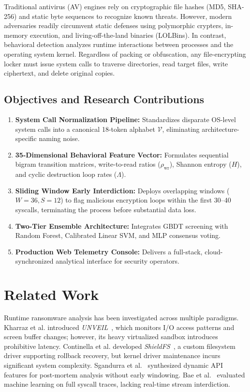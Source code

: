 \documentclass[conference]{IEEEtran}
\begin{document}
Traditional antivirus (AV) engines rely on cryptographic file hashes (MD5, SHA-256) and static byte sequences to recognize known threats. However, modern adversaries readily circumvent static defenses using polymorphic crypters, in-memory execution, and living-off-the-land binaries (LOLBins). In contrast, behavioral detection analyzes runtime interactions between processes and the operating system kernel. Regardless of packing or obfuscation, any file-encrypting locker must issue system calls to traverse directories, read target files, write ciphertext, and delete original copies.

\subsection{Objectives and Research Contributions}
\begin{enumerate}
    \item \textbf{System Call Normalization Pipeline:} Standardizes disparate OS-level system calls into a canonical 18-token alphabet $\mathcal{V}$, eliminating architecture-specific naming noise.
    \item \textbf{35-Dimensional Behavioral Feature Vector:} Formulates sequential bigram transition matrices, write-to-read ratios ($\rho_{\text{wr}}$), Shannon entropy ($H$), and cyclic destruction loop rates ($\Lambda$).
    \item \textbf{Sliding Window Early Interdiction:} Deploys overlapping windows ($W=36, S=12$) to flag malicious encryption loops within the first 30--40 syscalls, terminating the process before substantial data loss.
    \item \textbf{Two-Tier Ensemble Architecture:} Integrates GBDT screening with Random Forest, Calibrated Linear SVM, and MLP consensus voting.
    \item \textbf{Production Web Telemetry Console:} Delivers a full-stack, cloud-synchronized analytical interface for security operators.
\end{enumerate}

\section{Related Work}
Runtime ransomware analysis has been investigated across multiple paradigms. Kharraz et al. introduced \textit{UNVEIL}~\cite{kharraz2016unveil}, which monitors I/O access patterns and screen buffer changes; however, its heavy virtualized sandbox introduces prohibitive latency. Continella et al. developed \textit{ShieldFS}~\cite{continella2016shieldfs}, a custom filesystem driver supporting rollback recovery, but kernel driver maintenance incurs significant system complexity. Sgandurra et al.~\cite{sgandurra2018automated} synthesized dynamic API features for post-mortem analysis without early windowing. Bae et al.~\cite{bae2020ransomware} evaluated machine learning on full syscall traces, lacking real-time stream interdiction. 
\end{document}
